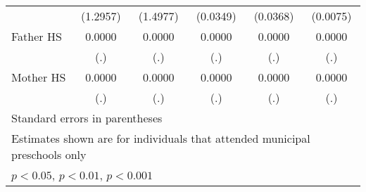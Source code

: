\begin{table}[htbp]
\begin{tabular}{l*{5}{c}}
            &    (1.2957)         &    (1.4977)         &    (0.0349)         &    (0.0368)         &    (0.0075)         \\
\addlinespace
Father HS   &      0.0000         &      0.0000         &      0.0000         &      0.0000         &      0.0000         \\
            &         (.)         &         (.)         &         (.)         &         (.)         &         (.)         \\
\addlinespace
Mother HS   &      0.0000         &      0.0000         &      0.0000         &      0.0000         &      0.0000         \\
            &         (.)         &         (.)         &         (.)         &         (.)         &         (.)         \\
\bottomrule
\multicolumn{6}{l}{\footnotesize Standard errors in parentheses}\\
\multicolumn{6}{l}{\footnotesize Estimates shown are for individuals that attended municipal preschools only}\\
\multicolumn{6}{l}{\footnotesize \sym{*} \(p<0.05\), \sym{**} \(p<0.01\), \sym{***} \(p<0.001\)}\\
\end{tabular}
\end{table}

